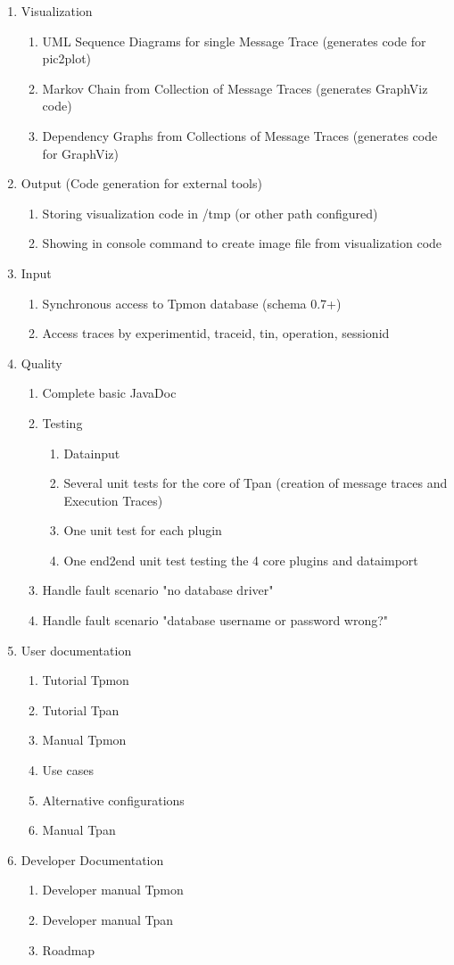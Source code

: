 \documentclass{scrartcl}
\begin{document}
\begin{enumerate}
\item Visualization
\begin{enumerate}
 \item UML Sequence Diagrams for single Message Trace (generates code for pic2plot)
\item Markov Chain from Collection of Message Traces (generates GraphViz code)
\item Dependency Graphs from Collections of Message Traces (generates code for GraphViz)
\end{enumerate}
\item Output (Code generation for external tools)
\begin{enumerate}
 \item Storing visualization code in /tmp (or other path configured)
\item Showing in console command to create image file from visualization code
\end{enumerate}
\item Input
\begin{enumerate}
\item Synchronous access to Tpmon database (schema 0.7+)
\item Access traces by experimentid, traceid, tin, operation, sessionid
\end{enumerate}
\item Quality
\begin{enumerate}
 \item Complete basic JavaDoc
\item Testing
\begin{enumerate}
 \item Datainput
\item Several unit tests for the core of Tpan (creation of message traces and Execution Traces)
\item One unit test for each plugin
\item One end2end unit test testing the 4 core plugins and dataimport
\end{enumerate}
\item Handle fault scenario "no database driver"
\item Handle fault scenario "database username or password wrong?"
\end{enumerate}
\item User documentation
\begin{enumerate}
 \item Tutorial Tpmon
\item Tutorial Tpan
\item Manual Tpmon
\item Use cases
\item Alternative configurations
\item Manual Tpan
\end{enumerate}

\item Developer Documentation
\begin{enumerate}
\item Developer manual Tpmon
\item Developer manual Tpan
\item Roadmap
\end{enumerate}
\end{enumerate}
\end{document}
